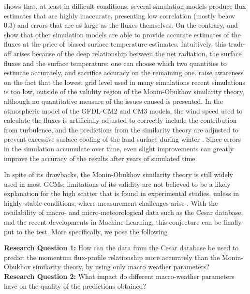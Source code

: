\documentclass[a4paper,11pt]{kth-mag}
\begin{document}
\cite{sheba} shows that, at least in difficult conditions, several simulation models produce flux estimates that are highly inaccurate, presenting low correlation (mostly below 0.3) and errors that are as large as the fluxes themselves. On the contrary, \cite{boundary_layer_impact_in_sim} and \cite{most_sim} show that other simulation models are able to provide accurate estimates of the fluxes at the price of biased surface temperature estimates. Intuitively, this trade-off arises because of the deep relationship between the net radiation, the surface fluxes and the surface temperature: one can choose which two quantities to estimate accurately, and sacrifice accuracy on the remaining one. \cite{most_les} raise awareness on the fact that the lowest grid level used in many simulations recent simulations is too low, outside of the validity region of the Monin-Obukhov similarity theory, although no quantitative measure of the issues caused is presented. In the atmospheric model of the GFDL-CM2 and CM3 models, the wind speed used to calculate the fluxes is artificially adjusted to correctly include the contribution from turbulence, and the predictions from the similarity theory are adjusted to prevent excessive surface cooling of the land surface during winter \citep{gfdl_am2}. Since errors in the simulation accumulate over time, even slight improvements can greatly improve the accuracy of the results after years of simulated time.

In spite of its drawbacks, the Monin-Obukhov similarity theory is still widely used in most GCMs; limitations of its validity are not believed to be a likely explanation for the high scatter that is found in experimental studies, unless in highly stable conditions, where measurement challenges arise \citep{basicatm}. With the availability of macro- and micro-meteorological data such as the Cesar database, and the recent developments in Machine Learning, this conjecture can be finally put to the test. More specifically, we pose the following \\

\begin{tcolorbox}
\textbf{Research Question 1:} How can the data from the Cesar database be used to predict the momentum flux-profile relationship more accurately than the Monin-Obukhov similarity theory, by using only macro weather parameters? \\

\noindent\textbf{Research Question 2:} What impact do different macro-weather parameters have on the quality of the predictions obtained?
\end{tcolorbox}
\end{document}

